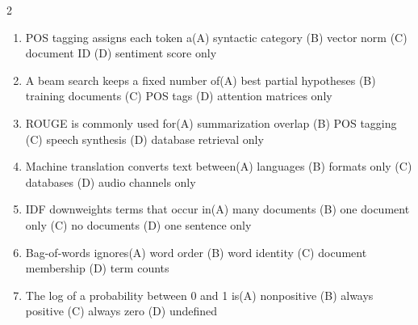 \documentclass[a4paper]{article}
\begin{document}
\begin{multicols*}{2}
\begin{enumerate}[resume]
\item POS tagging assigns each token a\newline\hspace*{0.6em}(A) syntactic category \quad (B) vector norm \newline\hspace*{0.6em}(C) document ID \quad (D) sentiment score only
\item A beam search keeps a fixed number of\newline\hspace*{0.6em}(A) best partial hypotheses \quad (B) training documents \newline\hspace*{0.6em}(C) POS tags \quad (D) attention matrices only
\item ROUGE is commonly used for\newline\hspace*{0.6em}(A) summarization overlap \quad (B) POS tagging \newline\hspace*{0.6em}(C) speech synthesis \quad (D) database retrieval only
\item Machine translation converts text between\newline\hspace*{0.6em}(A) languages \quad (B) formats only \newline\hspace*{0.6em}(C) databases \quad (D) audio channels only
\item IDF downweights terms that occur in\newline\hspace*{0.6em}(A) many documents \quad (B) one document only \newline\hspace*{0.6em}(C) no documents \quad (D) one sentence only
\item Bag-of-words ignores\newline\hspace*{0.6em}(A) word order \quad (B) word identity \newline\hspace*{0.6em}(C) document membership \quad (D) term counts
\item The log of a probability between 0 and 1 is\newline\hspace*{0.6em}(A) nonpositive \quad (B) always positive \newline\hspace*{0.6em}(C) always zero \quad (D) undefined

\end{enumerate}
\end{multicols*}
\end{document}
